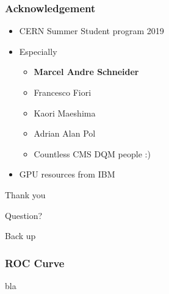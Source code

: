 \documentclass{beamer}
\begin{document}

\begin{frame}
\frametitle{Acknowledgement}
\begin{itemize}
    \item CERN Summer Student program 2019
    \item Especially
    \begin{itemize}
        \item \textbf{Marcel Andre Schneider}
        \item Francesco Fiori
        \item Kaori Maeshima
        \item Adrian Alan Pol
        \item Countless CMS DQM people :)
    \end{itemize}
    \item GPU resources from IBM
\end{itemize}
\end{frame}

\begin{frame}
\Huge{\centerline{Thank you}}
\end{frame}
\begin{frame}
\Huge{\centerline{Question?}}
\end{frame}

\begin{frame}
\Huge{\centerline{Back up}}
\end{frame}

\begin{frame}
\frametitle{ROC Curve}
bla
\end{frame}

\end{document}
